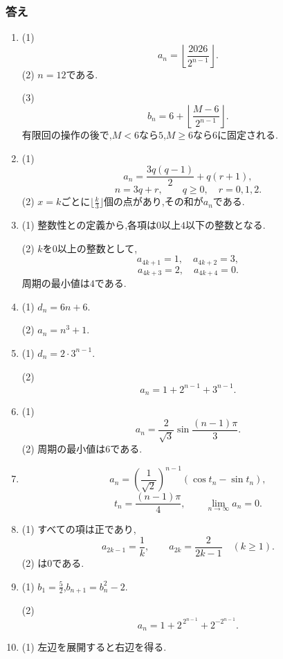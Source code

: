 \subsubsection{答え}\label{節：発展・特殊型：答え}
\begin{enumerate}[label=\textbf{問\arabic*.},leftmargin=3.8em,format=\bookitemlink{practice-special}{answer}{solution}]
  \item (1)
    \[
      a_n=\left\lfloor\frac{2026}{2^{n-1}}\right\rfloor.
    \]
    (2) $n=12$である.
    \par\smallskip\noindent
    (3)
    \[
      b_n=6+\left\lfloor\frac{M-6}{2^{n-1}}\right\rfloor.
    \]
    有限回の操作の後で,$M<6$なら$5$,$M\ge6$なら$6$に固定される.
  \item (1)
    \[
      a_n=\frac{3q(q-1)}2+q(r+1),
    \]
    \[
      n=3q+r,\qquad q\ge0,\quad r=0,1,2.
    \]
    (2) $x=k$ごとに$\lfloor\frac{k}{3}\rfloor$個の点があり,その和が$a_n$である.
  \item (1) 整数性との定義から,各項は$0$以上$4$以下の整数となる.
    \par\smallskip\noindent
    (2) $k$を$0$以上の整数として,
    \[
      a_{4k+1}=1,\quad a_{4k+2}=3,
    \]
    \[
      a_{4k+3}=2,\quad a_{4k+4}=0.
    \]
    周期の最小値は$4$である.
  \item (1) $d_n=6n+6$.
    \par\smallskip\noindent
    (2) $a_n=n^3+1$.
  \item (1) $d_n=2\cdot3^{n-1}$.
    \par\smallskip\noindent
    (2)
    \[
      a_n=1+2^{n-1}+3^{n-1}.
    \]
  \item (1)
    \[
      a_n=\frac2{\sqrt3}\sin\frac{(n-1)\pi}{3}.
    \]
    (2) 周期の最小値は$6$である.
  \item
    \[
      a_n=\left(\frac1{\sqrt2}\right)^{n-1}
      \left(\cos t_n-\sin t_n\right),
    \]
    \[
      t_n=\frac{(n-1)\pi}{4},\qquad
      \lim_{n\to\infty}a_n=0.
    \]
  \item (1) すべての項は正であり,
    \[
      a_{2k-1}=\frac1k,\qquad
      a_{2k}=\frac2{2k-1}\quad(k\ge1).
    \]
    (2) は$0$である.
  \item (1) $b_1=\frac52$,$b_{n+1}=b_n^2-2$.
    \par\smallskip\noindent
    (2)
    \[
      a_n=1+2^{\,2^{n-1}}+2^{-2^{n-1}}.
    \]
  \item (1) 左辺を展開すると右辺を得る.

\end{enumerate}
